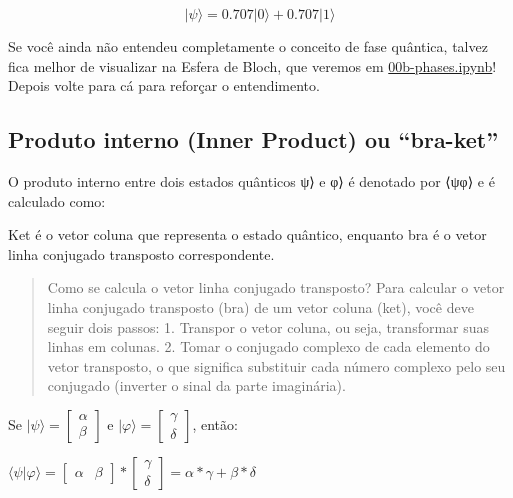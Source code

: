 \documentclass[
  brazilian,
]{report}
\begin{document}
\[|\psi\rangle = 0.707|0\rangle + 0.707|1\rangle\]

Se você ainda não entendeu completamente o conceito de fase quântica,
talvez fica melhor de visualizar na Esfera de Bloch, que veremos em
\url{00b-phases.ipynb}! Depois volte para cá para reforçar o
entendimento.

\subsection{Produto interno (Inner Product) ou
``bra-ket''}\label{produto-interno-inner-product-ou-bra-ket}

O produto interno entre dois estados quânticos \textbar ψ⟩ e \textbar φ⟩
é denotado por ⟨ψ\textbar φ⟩ e é calculado como:

Ket é o vetor coluna que representa o estado quântico, enquanto bra é o
vetor linha conjugado transposto correspondente.

\begin{quote}
Como se calcula o vetor linha conjugado transposto? Para calcular o
vetor linha conjugado transposto (bra) de um vetor coluna (ket), você
deve seguir dois passos: 1. Transpor o vetor coluna, ou seja,
transformar suas linhas em colunas. 2. Tomar o conjugado complexo de
cada elemento do vetor transposto, o que significa substituir cada
número complexo pelo seu conjugado (inverter o sinal da parte
imaginária).
\end{quote}

Se \(|ψ⟩ = \begin{bmatrix} 𝛼 \\ 𝛽 \end{bmatrix}\) e
\(|φ⟩ = \begin{bmatrix} γ \\ δ \end{bmatrix}\), então:

\(⟨ψ|φ⟩ = \begin{bmatrix} 𝛼 & 𝛽 \end{bmatrix} * \begin{bmatrix} γ \\ δ \end{bmatrix} = 𝛼*γ +𝛽*δ\)
\end{document}
